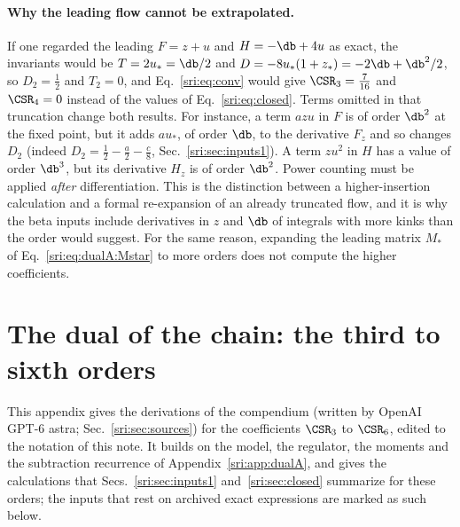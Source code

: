 \paragraph{Why the leading flow cannot be extrapolated.} If one regarded the leading $F=z+u$ and $H=-\db+4u$ as
exact, the invariants would be $T=2u_*=\db/2$ and $D=-8u_*(1+z_*)=-2\db+\db^2/2$, so $D_2=\frac12$ and $T_2=0$, and
Eq.~\eqref{sri:eq:conv} would give $\CSR_3=\frac7{16}$ and $\CSR_4=0$ instead of the values of Eq.~\eqref{sri:eq:closed}.
Terms omitted in that truncation change both results. For instance, a term $azu$ in $F$ is of order $\db^2$ at the
fixed point, but it adds $au_*$, of order $\db$, to the derivative $F_z$ and so changes $D_2$ (indeed
$D_2=\frac12-\frac a2-\frac c8$, Sec.~\ref{sri:sec:inputs1}). A term $zu^2$ in $H$ has a value of order $\db^3$, but its
derivative $H_z$ is of order $\db^2$. Power counting must be applied \emph{after} differentiation. This is the
distinction between a higher-insertion calculation and a formal re-expansion of an already truncated flow, and it is
why the beta inputs include derivatives in $z$ and $\db$ of integrals with more kinks than the order would suggest.
For the same reason, expanding the leading matrix $M_*$ of Eq.~\eqref{sri:eq:dualA:Mstar} to more orders does not compute
the higher coefficients.

\section{The dual of the chain: the third to sixth orders}\label{sri:app:dualB}
This appendix gives the derivations of the compendium (written by OpenAI GPT-6 astra; Sec.~\ref{sri:sec:sources}) for
the coefficients $\CSR_3$ to $\CSR_6$, edited to the notation of this note. It builds on the model, the regulator,
the moments and the subtraction recurrence of Appendix~\ref{sri:app:dualA}, and gives the calculations that
Secs.~\ref{sri:sec:inputs1} and~\ref{sri:sec:closed} summarize for these orders; the inputs that rest on archived exact
expressions are marked as such below.

